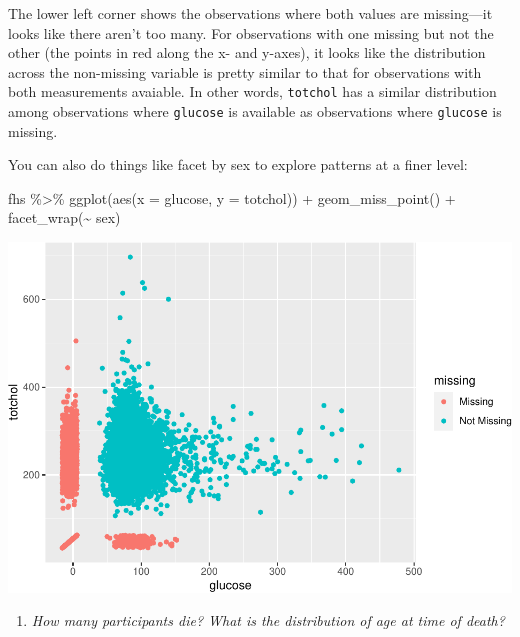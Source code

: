 \documentclass[
]{book}
\newenvironment{Shaded}{\begin{snugshade}}{\end{snugshade}}
\newcommand{\AttributeTok}[1]{\textcolor[rgb]{0.77,0.63,0.00}{#1}}
\newcommand{\FunctionTok}[1]{\textcolor[rgb]{0.00,0.00,0.00}{#1}}
\newcommand{\NormalTok}[1]{#1}
\newcommand{\SpecialCharTok}[1]{\textcolor[rgb]{0.00,0.00,0.00}{#1}}
\providecommand{\tightlist}{%
  \setlength{\itemsep}{0pt}\setlength{\parskip}{0pt}}
\begin{document}
The lower left corner shows the observations where both values are missing---it
looks like there aren't too many. For observations with one missing but not the
other (the points in red along the x- and y-axes), it looks like the distribution
across the non-missing variable is pretty similar to that for observations
with both measurements avaiable. In other words, \texttt{totchol} has a similar
distribution among observations where \texttt{glucose} is available as observations
where \texttt{glucose} is missing.

You can also do things like facet by sex to explore patterns at a finer level:

\begin{Shaded}
\begin{Highlighting}[]
\NormalTok{fhs }\SpecialCharTok{\%\textgreater{}\%} 
  \FunctionTok{ggplot}\NormalTok{(}\FunctionTok{aes}\NormalTok{(}\AttributeTok{x =}\NormalTok{ glucose, }\AttributeTok{y =}\NormalTok{ totchol)) }\SpecialCharTok{+} 
  \FunctionTok{geom\_miss\_point}\NormalTok{() }\SpecialCharTok{+} 
  \FunctionTok{facet\_wrap}\NormalTok{(}\SpecialCharTok{\textasciitilde{}}\NormalTok{ sex)}
\end{Highlighting}
\end{Shaded}

\includegraphics{adv_epi_analysis_files/figure-latex/unnamed-chunk-78-1.pdf}

\begin{enumerate}
\def\labelenumi{\arabic{enumi}.}
\setcounter{enumi}{2}
\tightlist
\item
  \emph{How many participants die? What is the distribution of age at time of death?}
\end{enumerate}
\end{document}

